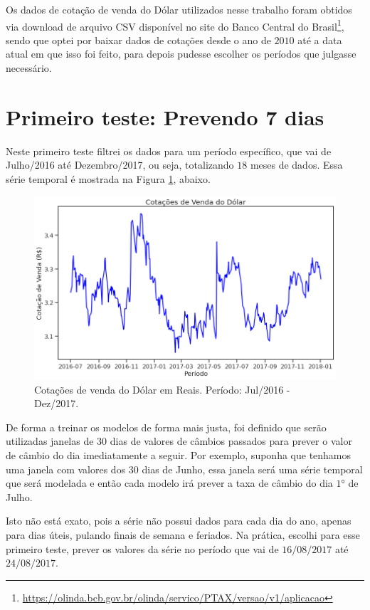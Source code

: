 Os dados de cotação de venda do Dólar utilizados nesse trabalho foram obtidos via download de arquivo CSV disponível no site do Banco Central do Brasil\footnote{\url{https://olinda.bcb.gov.br/olinda/servico/PTAX/versao/v1/aplicacao}}, sendo que optei por baixar dados de cotações desde o ano de $2010$ até a data atual em que isso foi feito, para depois pudesse escolher os períodos que julgasse necessário.

\section{Primeiro teste: Prevendo 7 dias}

Neste primeiro teste filtrei os dados para um período específico, que vai de Julho/2016 até Dezembro/2017, ou seja, totalizando $18$ meses de dados. Essa série temporal é mostrada na Figura \ref{fig:serie_1}, abaixo.

\begin{figure}[htb]
\centering
\includegraphics[width=14cm]{figuras/serie_1}
\caption{Cotações de venda do Dólar em Reais. Período: Jul/2016 - Dez/2017.}
\label{fig:serie_1}
\end{figure}

De forma a treinar os modelos de forma mais justa, foi definido que serão utilizadas janelas de $30$ dias de valores de câmbios passados para prever o valor de câmbio do dia imediatamente a seguir. Por exemplo, suponha que tenhamos uma janela com valores dos $30$ dias de Junho, essa janela será uma série temporal que será modelada e então cada modelo irá prever a taxa de câmbio do dia $1$° de Julho.

Isto não está exato, pois a série não possui dados para cada dia do ano, apenas para dias úteis, pulando finais de semana e feriados. Na prática, escolhi para esse primeiro teste, prever os valores da série no período que vai de $16/08/2017$ até $24/08/2017$. 

